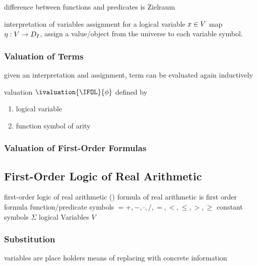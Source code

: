             difference between functions and predicates is Zielraum

            \begin{definition}[Assignment]
                interpretation of variables
                assignment for a logical variable $x\in V$
                map $\eta:V\rightarrow D_{I}$, assign a value/object from the universe to each variable symbol.
            \end{definition}


            \subsubsection{Valuation of Terms}
                \label{sec:valuation-of-terms}

                given an interpretation and assignment, term can be evaluated
                again inductively

                valuation $\ivaluation{\IFOL}{\phi}$ defined by
                \begin{enumerate}
                    \item logical variable
                    \item function symbol of arity
                \end{enumerate}

            \subsubsection{Valuation of First-Order Formulas}
                \label{sec:valuation-of-formulas}






        \subsection{First-Order Logic of Real Arithmetic}
            \label{sec:FOL-R}

            first-order logic of real arithmetic (\FOLR)
            formula of real arithmetic
            is first order formula
            function/predicate symbols $ = {+,-,\cdot,/,=,<,\leq,>,\geq}$
            constant symbols $\Sigma$
            logical Variables $V$


        \subsubsection{Substitution}
        \label{sec:substitution}

        variables are place holders
        means of replacing with concrete information
